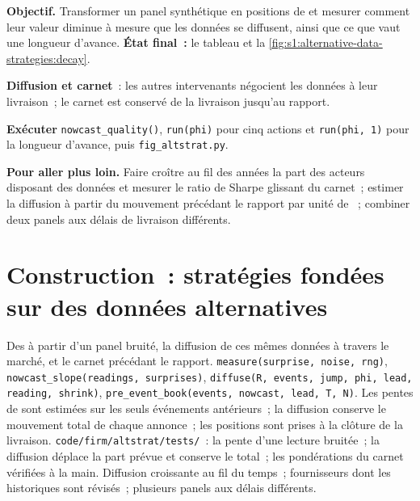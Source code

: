 \begin{tutorial}
\textbf{Objectif.} Transformer un panel synthétique en positions de  et mesurer comment leur valeur diminue à mesure que les données se diffusent, ainsi que ce que vaut une longueur d'avance.
\textbf{État final~:} le tableau et la \cref{fig:s1:alternative-data-strategies:decay}.
\begin{tutsteps}
\item \textbf{Diffusion et carnet}~: les autres intervenants négocient les données à leur livraison~; le carnet est conservé de la livraison jusqu'au rapport.
\label{lst:s1:alternative-data-strategies:diffuse}
\item \textbf{Exécuter} \texttt{nowcast\_quality()}, \texttt{run(phi)} pour cinq actions et \texttt{run(phi, 1)} pour la longueur d'avance, puis \texttt{fig\_altstrat.py}.
\end{tutsteps}
\textbf{Pour aller plus loin.} Faire croître au fil des années la part des acteurs disposant des données et mesurer le ratio de Sharpe glissant du carnet~; estimer la diffusion à partir du
mouvement précédant le rapport par unité de ~; combiner deux panels aux délais de livraison différents.
\end{tutorial}

\section{Construction~: stratégies fondées sur des données alternatives}\label{bld:s1:alternative-data-strategies:altstrat}

\begin{build}
 Des  à partir d'un panel bruité, la diffusion de ces mêmes données à travers le marché, et le carnet précédant le rapport.
 \texttt{measure(surprise, noise, rng)}, \texttt{nowcast\_slope(readings, surprises)},
\texttt{diffuse(R, events, jump, phi, lead, reading, shrink)}, \texttt{pre\_event\_book(events, nowcast, lead, T, N)}.
 Les pentes de  sont estimées sur les seuls événements antérieurs~; la diffusion conserve le mouvement total de chaque annonce~; les positions sont prises à la clôture de la livraison.
 \texttt{code/firm/altstrat/tests/}~: la pente d'une lecture bruitée~; la diffusion déplace la part prévue et conserve le total~; les pondérations
du carnet vérifiées à la main.
 Diffusion croissante au fil du temps~; fournisseurs dont les historiques sont révisés~; plusieurs panels aux délais différents.
\end{build}

